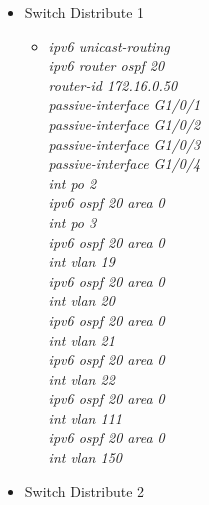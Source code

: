 \documentclass[12pt,a4paper]{report}
\begin{document}
\begin{itemize}
\begin{itemize}
\begin{itemize}
          \end{itemize}
             \item Switch Distribute 1
           
        \begin{itemize}
         \item \textit{ipv6 unicast-routing\\
ipv6 router ospf 20\\
router-id 172.16.0.50\\
passive-interface G1/0/1\\
passive-interface G1/0/2\\
passive-interface G1/0/3\\
passive-interface G1/0/4\\
int po 2\\
ipv6 ospf 20 area 0\\
int po 3\\
ipv6 ospf 20 area 0\\
int vlan 19\\
ipv6 ospf 20 area 0\\
int vlan 20\\
ipv6 ospf 20 area 0\\
int vlan 21\\
ipv6 ospf 20 area 0\\
int vlan 22\\
ipv6 ospf 20 area 0\\
int vlan 111\\
ipv6 ospf 20 area 0\\
int vlan 150\\}
        
          \end{itemize}
             \item Switch Distribute 2
           

\end{itemize}
\end{itemize}
\end{document}
